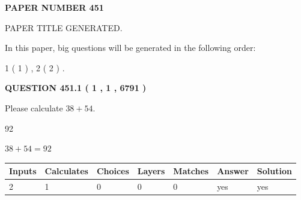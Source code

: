\documentclass[12pt]{article}
\begin{document}
   
 {\textbf{ \Large{ PAPER NUMBER  451  }}}
   
   
\vspace{0.2in}
   
   
   
   
   
   
   
   
 \vspace{0.2in}
 
 
 
 
   
   
 PAPER TITLE GENERATED.
   
   
   
\vspace{0.2in}
   
In this paper, big questions will be generated in the following order: 
   
   
   1 ( 1 )
 ,
   2 ( 2 )
 .
  
\vspace{0.2in}
  
{\textbf{\Large{QUESTION
451.1 
 ( 1 , 1 , 6791 )
}}}
  
  
 
Please calculate $ %
38 +  %
54 $.
 
 
 
\noindent{}
 
 

92
 
 
\noindent{}
 
 

 
 
 
\noindent{}
 
 

$ %
38 +  %
54=   %
92$
 
 
\noindent{}
 
 

 
   
   
   
   
\noindent\begin{tabular}{|l|l|l|l|l|l|l|}
 \hline
Inputs & Calculates & Choices & Layers & Matches & Answer & Solution \\ \hline
 2  & 
 1  & 
 0
  & 
 0  & 
 0  & 
  yes & 
  yes 
  \\ \hline
 \end{tabular}
   
\end{document}
